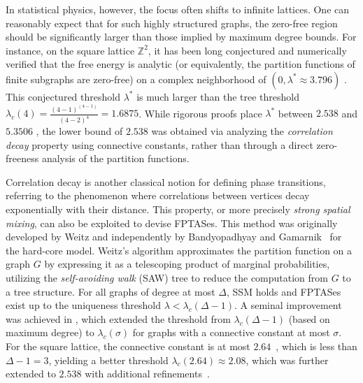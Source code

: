 \documentclass[a4paper,11pt]{article}
\theoremstyle{plain}
\theoremstyle{definition}
\theoremstyle{remark}
\newcommand{\1}{\mathbf{1}}
\begin{document}
 In statistical physics, however, the focus often shifts to infinite lattices. One can reasonably expect that for such highly structured graphs, the zero-free region should be significantly larger than those implied by maximum degree bounds.
For instance, on the square lattice $\mathbb{Z}^2$,  it has been long conjectured and numerically verified that the free energy is analytic (or equivalently, the partition functions of finite subgraphs are zero-free) on a complex neighborhood of $(0, \lambda^\ast \approx 3.796)$ \cite{vera2013improved}.
This conjectured threshold $\lambda^\ast$ is much larger than the tree threshold $\lambda_c(4)=\frac{(4-1)^{(4-1)}}{(4-2)^4}=1.6875$. 
While rigorous proofs place $\lambda^\ast$ between $2.538$ \cite{sinclair2017spatial} and $5.3506$ \cite{blanca2019phase}, the lower bound of $2.538$ was obtained via analyzing the \emph{correlation decay} property using connective constants, rather than through a direct zero-freeness analysis of the partition functions.




Correlation decay is another classical notion for defining phase transitions, referring to the phenomenon where correlations between vertices decay exponentially with their distance. This property, or more precisely \emph{strong spatial mixing},  can also be exploited to devise FPTASes. 
This method was originally developed by Weitz \cite{weitz2006counting} and independently by Bandyopadhyay and Gamarnik~\cite{bandyopadhyay2008counting} for the hard-core model. 
Weitz’s algorithm approximates the partition function on a graph $G$ by expressing it as a telescoping product of marginal probabilities, utilizing the \emph{self-avoiding walk} (SAW) tree to reduce the computation from $G$ to a tree structure. 
For all graphs of degree at most $\Delta$, SSM holds and FPTASes exist up to the uniqueness threshold $\lambda < \lambda_c(\Delta-1)$. 
A seminal improvement was achieved in \cite{sinclair2017spatial}, which extended the threshold from $\lambda_c(\Delta-1)$ (based on maximum degree) to $\lambda_c(\sigma)$ for graphs with a connective constant at most $\sigma$. 
 For the square lattice, the connective constant is at most $2.64$~\cite{jacobsen2016growth}, which is less than $\Delta -1=3$, yielding a better threshold $\lambda_c(2.64)\approx 2.08$, which was further extended to $2.538$ with additional refinements~\cite{sinclair2017spatial}.
 
 
\end{document}
